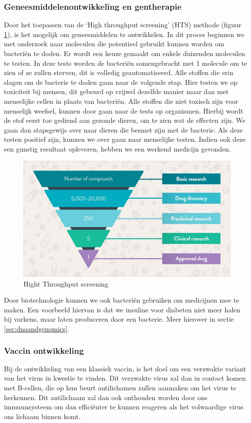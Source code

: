 \documentclass[a4paper,kul]{kulakarticle} %
\begin{document}
\subsubsection{Geneesmiddelenontwikkeling en gentherapie}
Door het toepassen van de `High throughput screening' (HTS) methode (figuur \ref{fig:hts}), is het mogelijk om geneesmiddelen te ontwikkelen. In dit proces beginnen we met onderzoek naar moleculen die potentieel gebruikt kunnen worden om bacteriën te doden. Er wordt een keuze gemaakt om enkele duizenden moleculen te testen. In deze tests worden de bacteriën samengebracht met 1 molecule om te zien of ze zullen sterven, dit is volledig geautomatiseerd. Alle stoffen die erin slagen om de bacterie te doden gaan naar de volgende stap. Hier testen we op toxiciteit bij mensen, dit gebeurd op vrijwel dezelfde manier maar dan met menselijke cellen in plaats van bacteriën. Alle stoffen die niet toxisch zijn voor menselijk weefsel, kunnen door gaan naar de tests op organismen. Hierbij wordt de stof eerst toe gediend aan gezonde dieren, om te zien wat de effecten zijn. We gaan dan stapsgewijs over naar dieren die besmet zijn met de bacterie. Als deze testen positief zijn, kunnen we over gaan naar menselijke testen. Indien ook deze een gunstig resultaat opleveren, hebben we een werkend medicijn gevonden. 
\begin{figure}[h]
	\centering
	\includegraphics[width=0.7\linewidth]{HTS}
	\caption[HTS]{Hight Throughput screening}
	\label{fig:hts}
\end{figure}

Door biotechnologie kunnen we ook bacteriën gebruiken om medicijnen mee te maken. Een voorbeeld hiervan is dat we insuline voor diabeten niet meer halen bij varkens, maar laten produceren door een bacterie. Meer hierover in sectie \ref{sec:dnaandgenomics}.
\subsubsection{Vaccin ontwikkeling}
Bij de ontwikkeling van een klassiek vaccin, is het doel om een verzwakte variant van het virus in kwestie te vinden. Dit verzwakte virus zal dan in contact komen met B-cellen, die op hun beurt antilichamen zullen aanmaken om het virus te herkennen. Dit antilichaam zal dan ook onthouden worden door ons immuunsysteem om dan efficiënter te kunnen reageren als het volwaardige virus ons lichaam binnen komt. 
\end{document}
